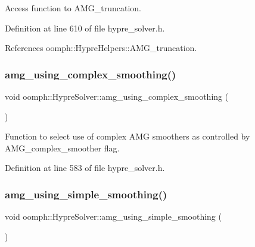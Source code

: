 Access function to A\+M\+G\+\_\+truncation. 



Definition at line 610 of file hypre\+\_\+solver.\+h.



References oomph\+::\+Hypre\+Helpers\+::\+A\+M\+G\+\_\+truncation.

\mbox{\label{classoomph_1_1HypreSolver_a7bef620aeade1b657f5051c93bf7e437}} 
\subsubsection{\texorpdfstring{amg\+\_\+using\+\_\+complex\+\_\+smoothing()}{amg\_using\_complex\_smoothing()}}
{\footnotesize\ttfamily void oomph\+::\+Hypre\+Solver\+::amg\+\_\+using\+\_\+complex\+\_\+smoothing (\begin{DoxyParamCaption}{ }\end{DoxyParamCaption})\hspace{0.3cm}{\ttfamily [inline]}}



Function to select use of \textquotesingle{}complex\textquotesingle{} A\+MG smoothers as controlled by A\+M\+G\+\_\+complex\+\_\+smoother flag. 



Definition at line 583 of file hypre\+\_\+solver.\+h.

\mbox{\label{classoomph_1_1HypreSolver_a87dd154df66240c7cb3ef08610ab72f8}} 
\subsubsection{\texorpdfstring{amg\+\_\+using\+\_\+simple\+\_\+smoothing()}{amg\_using\_simple\_smoothing()}}
{\footnotesize\ttfamily void oomph\+::\+Hypre\+Solver\+::amg\+\_\+using\+\_\+simple\+\_\+smoothing (\begin{DoxyParamCaption}{ }\end{DoxyParamCaption})\hspace{0.3cm}{\ttfamily [inline]}}



